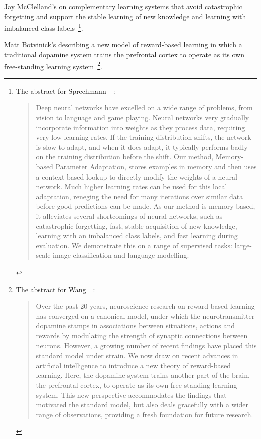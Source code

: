 Jay McClelland's {} on complementary learning systems that avoid catastrophic forgetting and support the stable learning of new knowledge and learning with imbalanced class labels~\cite{SprechmannetalICLR-18}\footnote{%
%
  The abstract for Sprechmann~\etal{}~\cite{SprechmannetalICLR-18}:
%
  \begin{quotation}
%
   Deep neural networks have excelled on a wide range of problems, from vision to language and game playing. Neural networks very gradually incorporate information into weights as they process data, requiring very low learning rates. If the training distribution shifts, the network is slow to adapt, and when it does adapt, it typically performs badly on the training distribution before the shift. Our method, Memory-based Parameter Adaptation, stores examples in memory and then uses a context-based lookup to directly modify the weights of a neural network. Much higher learning rates can be used for this local adaptation, reneging the need for many iterations over similar data before good predictions can be made. As our method is memory-based, it alleviates several shortcomings of neural networks, such as catastrophic forgetting, fast, stable acquisition of new knowledge, learning with an imbalanced class labels, and fast learning during evaluation. We demonstrate this on a range of supervised tasks: large-scale image classification and language modelling.
%
  \end{quotation}}.

Matt Botvinick's {} describing a new model of reward-based learning in which a traditional dopamine system trains the prefrontal cortex to operate as its own free-standing learning system~\cite{WangetalNATURE-NEUROSCIENCE-18}\footnote{%
%
  The abstract for Wang~\etal{}~\cite{WangetalNATURE-NEUROSCIENCE-18}:
%
  \begin{quotation}
%
   Over the past 20 years, neuroscience research on reward-based learning has converged on a canonical model, under which the neurotransmitter dopamine stamps in associations between situations, actions and rewards by modulating the strength of synaptic connections between neurons. However, a growing number of recent findings have placed this standard model under strain. We now draw on recent advances in artificial intelligence to introduce a new theory of reward-based learning. Here, the dopamine system trains another part of the brain, the prefrontal cortex, to operate as its own free-standing learning system. This new perspective accommodates the findings that motivated the standard model, but also deals gracefully with a wider range of observations, providing a fresh foundation for future research.
%
  \end{quotation}}.



